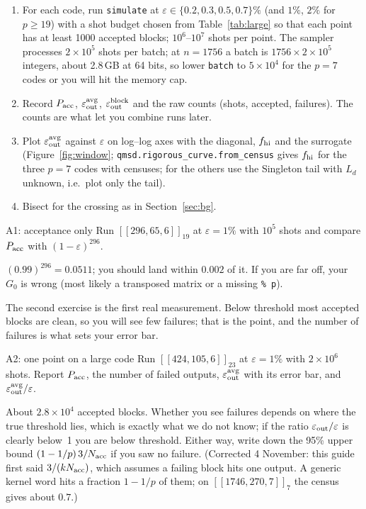 \documentclass[11pt]{article}
\newcommand{\eps}{\varepsilon}
\newcommand{\code}[1]{\texttt{#1}}
\begin{document}
\begin{enumerate}[nosep]
\item For each code, run \code{simulate} at $\eps\in\{0.2, 0.3, 0.5, 0.7\}\%$ (and
  $1\%$, $2\%$ for $p\ge19$) with a shot budget chosen from Table~\ref{tab:large} so
  that each point has at least 1000 accepted blocks; $10^6$--$10^7$ shots per point.
  The sampler processes $2\times10^5$ shots per batch; at $n=1756$ a batch is
  $1756\times2\times10^5$ integers, about 2.8\,GB at 64 bits, so lower \code{batch}
  to $5\times10^4$ for the $p=7$ codes or you will hit the memory cap.
\item Record $P_{\rm acc}$, $\eps_{\rm out}^{\rm avg}$, $\eps_{\rm out}^{\rm block}$
  and the raw counts (shots, accepted, failures). The counts are what let you combine
  runs later.
\item Plot $\eps_{\rm out}^{\rm avg}$ against $\eps$ on log--log axes with the
  diagonal, $f_{\rm hi}$ and the surrogate (Figure~\ref{fig:window};
  \code{qmsd.rigorous\_curve.from\_census} gives $f_{\rm hi}$ for the three $p=7$
  codes with censuses; for the others use the Singleton tail with $L_d$ unknown, i.e.\
  plot only the tail).
\item Bisect for the crossing as in Section~\ref{sec:bg}.
\end{enumerate}

\begin{exercise}{A1: acceptance only}
Run $[[296,65,6]]_{19}$ at $\eps=1\%$ with $10^5$ shots and compare $P_{\rm acc}$
with $(1-\eps)^{296}$.
\end{exercise}
\begin{checkbox}
$(0.99)^{296} = 0.0511$; you should land within $0.002$ of it. If you are far off,
your $G_0$ is wrong (most likely a transposed matrix or a missing \code{\% p}).
\end{checkbox}

The second exercise is the first real measurement. Below threshold most accepted
blocks are clean, so you will see few failures; that is the point, and the number of
failures is what sets your error bar.

\begin{exercise}{A2: one point on a large code}
Run $[[424,105,6]]_{23}$ at $\eps=1\%$ with $2\times10^6$ shots. Report $P_{\rm acc}$,
the number of failed outputs, $\eps_{\rm out}^{\rm avg}$ with its error bar, and
$\eps_{\rm out}^{\rm avg}/\eps$.
\end{exercise}
\begin{checkbox}
About $2.8\times10^4$ accepted blocks. Whether you see failures depends on where the
true threshold lies, which is exactly what we do not know; if the ratio
$\eps_{\rm out}/\eps$ is clearly below~1 you are below threshold. Either way, write
down the 95\% upper bound $(1-1/p)\,3/N_{\rm acc}$ if you saw no failure. (Corrected 4 November: this
guide first said $3/(k N_{\rm acc})$, which assumes a failing block hits one output. A generic kernel word hits a
fraction $1-1/p$ of them; on $[[1746,270,7]]_7$ the census gives about $0.7$.)
\end{checkbox}
\end{document}
